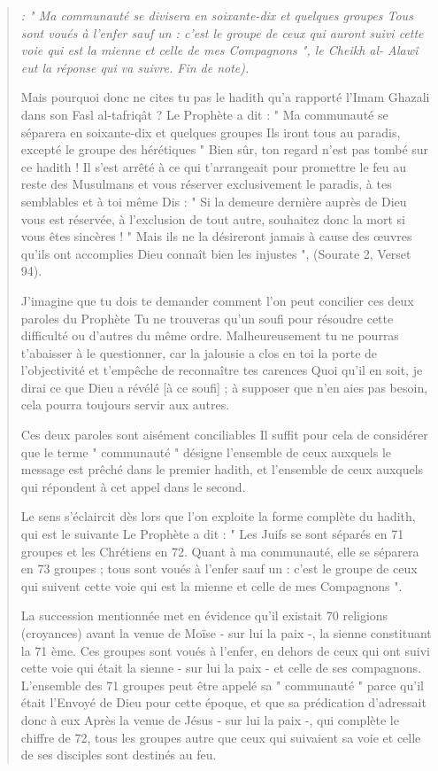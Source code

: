 \begin{quote}
\emph{: " Ma communauté se divisera en soixante-dix et quelques groupes
Tous sont voués à l'enfer sauf un : c'est le groupe de ceux qui auront
suivi cette voie qui est la mienne et celle de mes Compagnons ", le
Cheikh al- Alawî eut la réponse qui va suivre. Fin de note).}

Mais pourquoi donc ne cites tu pas le hadith qu'a rapporté l'Imam
Ghazali dans son Fasl al-tafriqât ? Le Prophète a dit : " Ma communauté
se séparera en soixante-dix et quelques groupes Ils iront tous au
paradis, excepté le groupe des hérétiques " Bien sûr, ton regard n'est
pas tombé sur ce hadith ! Il s'est arrêté à ce qui t'arrangeait pour
promettre le feu au reste des Musulmans et vous réserver exclusivement
le paradis, à tes semblables et à toi même Dis : " Si la demeure
dernière auprès de Dieu vous est réservée, à l'exclusion de tout autre,
souhaitez donc la mort si vous êtes sincères ! " Mais ils ne la
désireront jamais à cause des œuvres qu'ils ont accomplies Dieu connaît
bien les injustes ", (Sourate 2, Verset 94).

J'imagine que tu dois te demander comment l'on peut concilier ces deux
paroles du Prophète Tu ne trouveras qu'un soufi pour résoudre cette
difficulté ou d'autres du même ordre. Malheureusement tu ne pourras
t'abaisser à le questionner, car la jalousie a clos en toi la porte de
l'objectivité et t'empêche de reconnaître tes carences Quoi qu'il en
soit, je dirai ce que Dieu a révélé {[}à ce soufi{]} ; à supposer que
n'en aies pas besoin, cela pourra toujours servir aux autres.

Ces deux paroles sont aisément conciliables Il suffit pour cela de
considérer que le terme " communauté " désigne l'ensemble de ceux
auxquels le message est prêché dans le premier hadith, et l'ensemble de
ceux auxquels qui répondent à cet appel dans le second.

Le sens s'éclaircit dès lors que l'on exploite la forme complète du
hadith, qui est le suivante Le Prophète a dit : " Les Juifs se sont
séparés en 71 groupes et les Chrétiens en 72. Quant à ma communauté,
elle se séparera en 73 groupes ; tous sont voués à l'enfer sauf un :
c'est le groupe de ceux qui suivent cette voie qui est la mienne et
celle de mes Compagnons ".

La succession mentionnée met en évidence qu'il existait 70 religions
(croyances) avant la venue de Moïse - sur lui la paix -, la sienne
constituant la 71 ème. Ces groupes sont voués à l'enfer, en dehors de
ceux qui ont suivi cette voie qui était la sienne - sur lui la paix - et
celle de ses compagnons. L'ensemble des 71 groupes peut être appelé sa "
communauté " parce qu'il était l'Envoyé de Dieu pour cette époque, et
que sa prédication d'adressait donc à eux Après la venue de Jésus - sur
lui la paix -, qui complète le chiffre de 72, tous les groupes autre que
ceux qui suivaient sa voie et celle de ses disciples sont destinés au
feu.


\end{quote}
